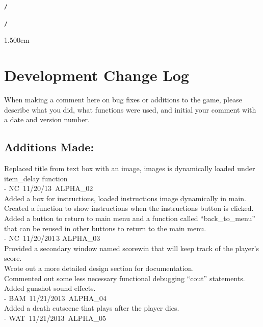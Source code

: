 \documentclass[12pt]{article}
\begin{document}
    \rm\mc 

\noindent
{\tt *}{\tt /}
\tt\mc 

\noindent
{}\tt\mc {\tt /}{\tt /}

\noindent
{\tt /}{\tt *}{\tt *}

\noindent
\kern1.500em  \section{Development Change Log}
   
   When making a comment here on bug fixes or additions to the game, please describe what you did, what functions were used, and initial your comment with a date and version number.
   
   \subsection{Additions Made:}
   
   Replaced title from text box with an image, images is dynamically loaded under item\_delay function \\
   	- NC\, 11/20/13\, ALPHA\_02 \\
   
   \noindent
   Added a box for instructions, loaded instructions image dynamically in main. \\
   	Created a function to show instructions when the instructions button is clicked. \\
   	Added a button to return to main menu and a function called ``back\_to\_menu'' that can be reused in other buttons to return to the main menu. \\
   	- NC\, 11/20/201\,3 ALPHA\_03 \\
   
   \noindent
   Provided a secondary window named scorewin that will keep track of the player's score. \\
   	Wrote out a more detailed design section for documentation. \\
   	Commented out some less necessary functional debugging ``cout'' statements. \\
   	Added gunshot sound effects. \\
   	- BAM\, 11/21/2013\, ALPHA\_04 \\
   
   \noindent	
   Added a death cutscene that plays after the player dies. \\
   	- WAT\, 11/21/2013\, ALPHA\_05 \\
   
\end{document}
